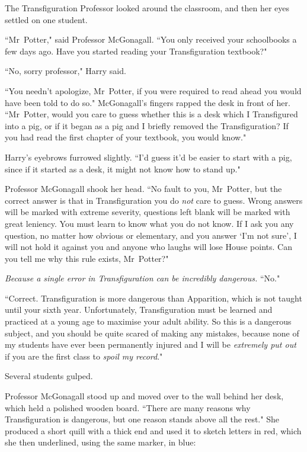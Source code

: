 The Transfiguration Professor looked around the classroom, and then her eyes settled on one student.

``Mr~Potter," said Professor McGonagall. ``You only received your schoolbooks a few days ago. Have you started reading your Transfiguration textbook?"

``No, sorry professor," Harry said.

``You needn't apologize, Mr~Potter, if you were required to read ahead you would have been told to do so." McGonagall's fingers rapped the desk in front of her. ``Mr~Potter, would you care to guess whether this is a desk which I Transfigured into a pig, or if it began as a pig and I briefly removed the Transfiguration? If you had read the first chapter of your textbook, you would know."

Harry's eyebrows furrowed slightly. ``I'd guess it'd be easier to start with a pig, since if it started as a desk, it might not know how to stand up."

Professor McGonagall shook her head. ``No fault to you, Mr~Potter, but the correct answer is that in Transfiguration you do \emph{not} care to guess. Wrong answers will be marked with extreme severity, questions left blank will be marked with great leniency. You must learn to know what you do not know. If I ask you any question, no matter how obvious or elementary, and you answer `I'm not sure', I will not hold it against you and anyone who laughs will lose House points. Can you tell me why this rule exists, Mr~Potter?"

\emph{Because a single error in Transfiguration can be incredibly dangerous.} ``No."

``Correct. Transfiguration is more dangerous than Apparition, which is not taught until your sixth year. Unfortunately, Transfiguration must be learned and practiced at a young age to maximise your adult ability. So this is a dangerous subject, and you should be quite scared of making any mistakes, because none of my students have ever been permanently injured and I will be \emph{extremely put out} if you are the first class to \emph{spoil my record}."

Several students gulped.

Professor McGonagall stood up and moved over to the wall behind her desk, which held a polished wooden board. ``There are many reasons why Transfiguration is dangerous, but one reason stands above all the rest." She produced a short quill with a thick end and used it to sketch letters in red, which she then underlined, using the same marker, in blue:

